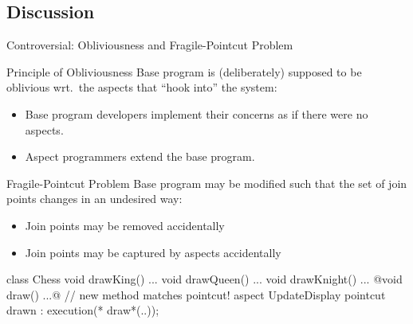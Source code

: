 \subsection{Discussion}

\begin{frame}[fragile]{Controversial: Obliviousness and Fragile-Pointcut Problem}
	\begin{mycolumns}[widths={45,55},animation=none]
		\begin{definition}{Principle of Obliviousness}
			Base program is (deliberately) supposed to be oblivious wrt.\ the aspects that ``hook into'' the system:
			\begin{itemize}
				\item Base program developers implement their concerns as if there were no aspects.
				\item Aspect programmers extend the base program.
			\end{itemize}
		\end{definition}
	\mynextcolumn
		\pause
		\begin{definition}{Fragile-Pointcut Problem}
			Base program may be modified such that the set of join points changes in an undesired way:
			\begin{itemize}
				\item Join points may be removed accidentally 
				\item Join points may be captured by aspects accidentally
			\end{itemize}
		\end{definition}
		\begin{codetight}{}
class Chess {
	void drawKing() {...}
	void drawQueen() {...}
	void drawKnight() {...}
	@void draw() {...}@ // new method matches pointcut!
}
aspect UpdateDisplay {
	pointcut drawn : execution(* draw*(..));
}
		\end{codetight}
	\end{mycolumns}
	\pause
	
\end{frame}

